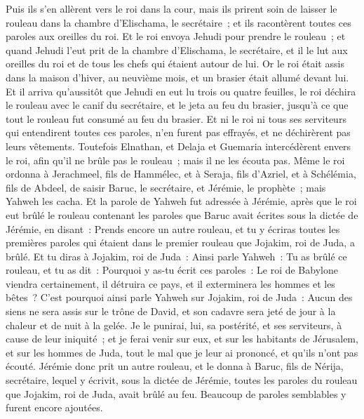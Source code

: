 \begin{multicols}{2}
Puis ils s'en allèrent vers le roi dans la cour, mais ils prirent soin de laisser le rouleau dans la chambre d'Elischama, le secrétaire~; et ils racontèrent toutes ces paroles aux oreilles du roi.
Et le roi envoya Jehudi pour prendre le rouleau~; et quand Jehudi l'eut prit de la chambre d'Elischama, le secrétaire, et il le lut aux oreilles du roi et de tous les chefs qui étaient autour de lui.
Or le roi était assis dans la maison d'hiver, au neuvième mois, et un brasier était allumé devant lui.
Et il arriva qu'aussitôt que Jehudi en eut lu trois ou quatre feuilles, le roi déchira le rouleau avec le canif du secrétaire, et le jeta au feu du brasier, jusqu'à ce que tout le rouleau fut consumé au feu du brasier.
Et ni le roi ni tous ses serviteurs qui entendirent toutes ces paroles, n'en furent pas effrayés, et ne déchirèrent pas leurs vêtements.
Toutefois Elnathan, et Delaja et Guemaria intercédèrent envers le roi, afin qu'il ne brûle pas le rouleau~; mais il ne les écouta pas.
Même le roi ordonna à Jerachmeel, fils de Hammélec, et à Seraja, fils d'Azriel, et à Schélémia, fils de Abdeel, de saisir Baruc, le secrétaire, et Jérémie, le prophète~; mais Yahweh les cacha.
Et la parole de Yahweh fut adressée à Jérémie, après que le roi eut brûlé le rouleau contenant les paroles que Baruc avait écrites sous la dictée de Jérémie, en disant~:
Prends encore un autre rouleau, et tu y écriras toutes les premières paroles qui étaient dans le premier rouleau que Jojakim, roi de Juda, a brûlé.
Et tu diras à Jojakim, roi de Juda~: Ainsi parle Yahweh~: Tu as brûlé ce rouleau, et tu as dit~: Pourquoi y as-tu écrit ces paroles~: Le roi de Babylone viendra certainement, il détruira ce pays, et il exterminera les hommes et les bêtes~?
C'est pourquoi ainsi parle Yahweh sur Jojakim, roi de Juda~: Aucun des siens ne sera assis sur le trône de David, et son cadavre sera jeté de jour à la chaleur et de nuit à la gelée.
Je le punirai, lui, sa postérité, et ses serviteurs, à cause de leur iniquité~; et je ferai venir sur eux, et sur les habitants de Jérusalem, et sur les hommes de Juda, tout le mal que je leur ai prononcé, et qu'ils n'ont pas écouté.
Jérémie donc prit un autre rouleau, et le donna à Baruc, fils de Nérija, secrétaire, lequel y écrivit, sous la dictée de Jérémie, toutes les paroles du rouleau que Jojakim, roi de Juda, avait brûlé au feu. Beaucoup de paroles semblables y furent encore ajoutées.

\end{multicols}
